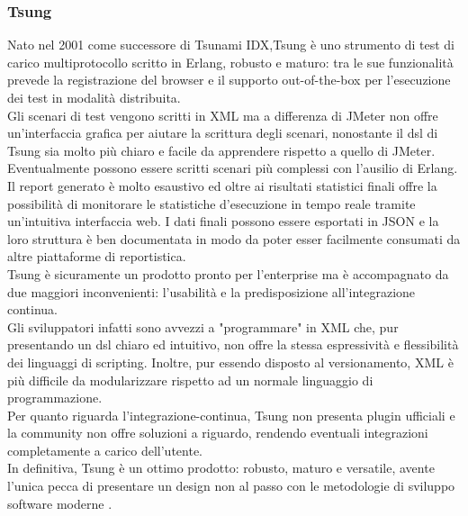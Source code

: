 \subsubsection{Tsung}
Nato nel 2001 come successore di Tsunami IDX,Tsung è uno strumento di test di carico multiprotocollo scritto in Erlang, robusto e maturo: tra le sue funzionalità prevede la registrazione del browser e il supporto \gls{out-of-the-box} per l'esecuzione dei test in modalità distribuita.\\
Gli scenari di test vengono scritti in XML ma a differenza di JMeter non offre un'interfaccia grafica per aiutare la scrittura degli scenari, nonostante il \gls{dsl} di Tsung sia molto più chiaro e facile da apprendere rispetto a quello di JMeter. Eventualmente possono essere scritti scenari più complessi con l'ausilio di Erlang. \\
Il report generato è molto esaustivo ed oltre ai risultati statistici finali offre la possibilità di monitorare le statistiche d'esecuzione in tempo reale tramite un'intuitiva interfaccia web. I dati finali possono essere esportati in JSON e la loro struttura è ben documentata in modo da poter esser facilmente consumati da altre piattaforme di reportistica.\\
Tsung è sicuramente un prodotto pronto per l'enterprise ma è accompagnato da due maggiori inconvenienti: l’usabilità e la predisposizione all’integrazione continua. \\
Gli sviluppatori infatti sono avvezzi a "programmare" in XML che, pur presentando un \gls{dsl} chiaro ed intuitivo, non offre la stessa espressività e flessibilità dei linguaggi di scripting. Inoltre, pur essendo disposto al versionamento, XML è più difficile da modularizzare rispetto ad un normale linguaggio di programmazione.\\
Per quanto riguarda l'\gls{integrazione-continua}, Tsung non presenta plugin ufficiali e la community non offre soluzioni a riguardo, rendendo eventuali integrazioni completamente a carico dell'utente.\\
In definitiva, Tsung è un ottimo prodotto: robusto, maturo e versatile, avente l'unica pecca di presentare un design non al passo con le metodologie di sviluppo software moderne	. 
